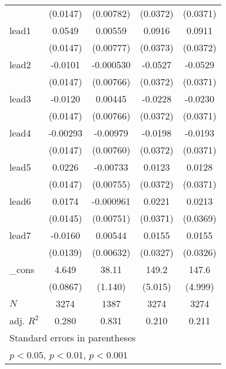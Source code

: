 {\begin{tabular}{l*{4}{c}}
            &    (0.0147)         &   (0.00782)         &    (0.0372)         &    (0.0371)         \\
[1em]
lead1       &      0.0549\sym{***}&     0.00559         &      0.0916\sym{*}  &      0.0911\sym{*}  \\
            &    (0.0147)         &   (0.00777)         &    (0.0373)         &    (0.0372)         \\
[1em]
lead2       &     -0.0101         &   -0.000530         &     -0.0527         &     -0.0529         \\
            &    (0.0147)         &   (0.00766)         &    (0.0372)         &    (0.0371)         \\
[1em]
lead3       &     -0.0120         &     0.00445         &     -0.0228         &     -0.0230         \\
            &    (0.0147)         &   (0.00766)         &    (0.0372)         &    (0.0371)         \\
[1em]
lead4       &    -0.00293         &    -0.00979         &     -0.0198         &     -0.0193         \\
            &    (0.0147)         &   (0.00760)         &    (0.0372)         &    (0.0371)         \\
[1em]
lead5       &      0.0226         &    -0.00733         &      0.0123         &      0.0128         \\
            &    (0.0147)         &   (0.00755)         &    (0.0372)         &    (0.0371)         \\
[1em]
lead6       &      0.0174         &   -0.000961         &      0.0221         &      0.0213         \\
            &    (0.0145)         &   (0.00751)         &    (0.0371)         &    (0.0369)         \\
[1em]
lead7       &     -0.0160         &     0.00544         &      0.0155         &      0.0155         \\
            &    (0.0139)         &   (0.00632)         &    (0.0327)         &    (0.0326)         \\
[1em]
\_cons      &       4.649\sym{***}&       38.11\sym{***}&       149.2\sym{***}&       147.6\sym{***}\\
            &    (0.0867)         &     (1.140)         &     (5.015)         &     (4.999)         \\
\hline
\(N\)       &        3274         &        1387         &        3274         &        3274         \\
adj. \(R^{2}\)&       0.280         &       0.831         &       0.210         &       0.211         \\
\hline\hline
\multicolumn{5}{l}{\footnotesize Standard errors in parentheses}\\
\multicolumn{5}{l}{\footnotesize \sym{*} \(p<0.05\), \sym{**} \(p<0.01\), \sym{***} \(p<0.001\)}\\
\end{tabular}
}
